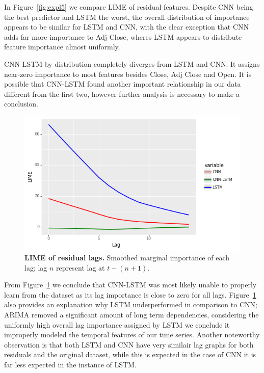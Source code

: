 \documentclass[12pt,journal,compsoc]{IEEEtran}
\begin{document}
\par In Figure~\ref{fig:expl5} we compare LIME of residual features.
Despite CNN being the best predictor and LSTM the worst, the overall distribution of importance appears to be similar for LSTM and CNN, with the clear exception that CNN adds far more importance to Adj Close, wheres LSTM appears to distribute feature importance almost uniformly.
\par CNN-LSTM by distribution completely diverges from LSTM and CNN. It assigns near-zero importance to most features besides Close, Adj Close and Open. It is possible that CNN-LSTM found another important relationship in our data different from the first two, however further analysis is necessary to make a conclusion. 
\begin{figure}[!ht]\centering
	\includegraphics[width=\linewidth]{images/fig6.png}
	\caption{\textbf{LIME of residual lags.} Smoothed marginal importance of each lag; lag $n$ represent lag at $t-(n+1)$.}
	\label{fig:expl6}
\end{figure}
\par From Figure~\ref{fig:expl6} we conclude that CNN-LSTM was most likely unable to properly learn from the dataset as its lag importance is close to zero for all lags. 
Figure~\ref{fig:expl6} also provides an explanation why LSTM underperformed in comparison to CNN; ARIMA removed a significant amount of long term dependencies, considering the uniformly high overall lag importance assigned by LSTM we conclude it improperly modeled the temporal features of our time series. 
Another noteworthy observation is that both LSTM and CNN have very similair lag graphs for both residuals and the original dataset, while this is expected in the case of CNN it is far less expected in the instance of LSTM. %
\end{document}
